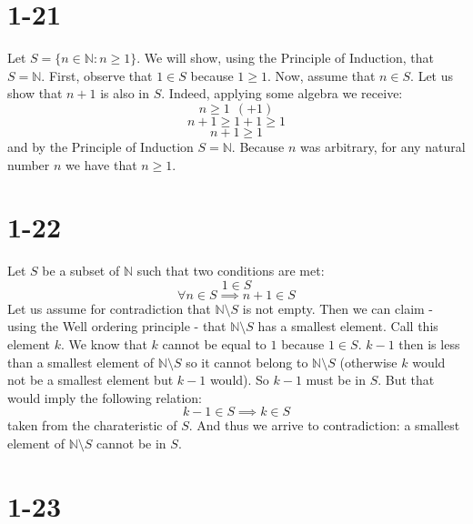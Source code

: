 \documentclass{article}
\begin{document}
\section*{1-21}
Let \(S = \{n \in \mathbb{N} : n \geq 1\}\). We will show, using the Principle of Induction, that \(S = \mathbb{N}\).
First, observe that \(1 \in S\) because \(1 \geq 1\). Now, assume that \(n \in S\). Let us show that \(n + 1\) is also in \(S\).
Indeed, applying some algebra we receive:
\begin{equation*}
    n \geq 1 \ \ (+1)
\end{equation*}
\begin{equation*}
    n + 1 \geq 1 + 1 \geq 1
\end{equation*}
\begin{equation*}
    n + 1 \geq 1 
\end{equation*}
and by the Principle of Induction \(S = \mathbb{N}\). Because \(n\) was arbitrary, for any natural number \(n\) we have that \(n \geq 1\).

\section*{1-22}
Let \(S\) be a subset of \(\mathbb{N}\) such that two conditions are met:
\begin{equation*}
    1 \in S
\end{equation*}
\begin{equation*}
    \forall n \in S \implies n + 1 \in S
\end{equation*}
Let us assume for contradiction that \(\mathbb{N } \setminus S \) is not empty. Then we can claim - using the Well ordering principle -
that \(\mathbb{N} \setminus S \) has a smallest element. Call this element \(k\). We know that \(k\) cannot be equal to \(1\) 
because \(1 \in S\). \(k - 1\) then is less than a smallest element of \(\mathbb{N} \setminus S\) so it cannot belong to
\(\mathbb{N} \setminus S\) (otherwise \(k\) would not be a smallest element but \(k-1\) would). So \(k - 1\) must be in \(S\).
But that would imply the following relation:
\begin{equation*}
    k - 1 \in S \implies k \in S
\end{equation*}
taken from the charateristic of \(S\). And thus we arrive to contradiction: 
a smallest element of \(\mathbb{N} \setminus S\) cannot be in \(S\).

\section*{1-23}
\end{document}
